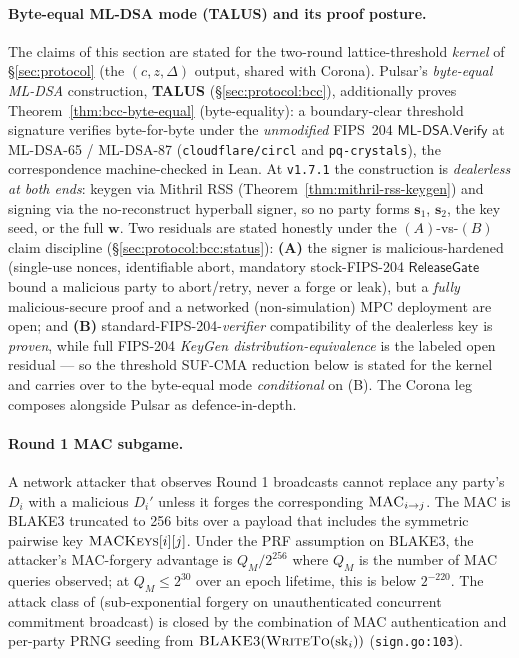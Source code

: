 \paragraph{Byte-equal ML-DSA mode (TALUS) and its proof posture.} The
claims of this section are stated for the two-round lattice-threshold
\emph{kernel} of \S\ref{sec:protocol} (the $(c, z, \Delta)$ output, shared
with Corona). Pulsar's \emph{byte-equal ML-DSA} construction, \textbf{TALUS}
(\S\ref{sec:protocol:bcc}), additionally proves
Theorem~\ref{thm:bcc-byte-equal} (byte-equality): a boundary-clear
threshold signature verifies byte-for-byte under the \emph{unmodified}
FIPS~204 $\mathsf{ML\text{-}DSA.Verify}$ at ML-DSA-65 / ML-DSA-87
(\texttt{cloudflare/circl} and \texttt{pq-crystals}), the correspondence
machine-checked in Lean. At \texttt{v1.7.1} the construction is
\emph{dealerless at both ends}: keygen via Mithril RSS
(Theorem~\ref{thm:mithril-rss-keygen}) and signing via the no-reconstruct
hyperball signer, so no party forms $\mathbf{s}_1$, $\mathbf{s}_2$, the key
seed, or the full $\mathbf{w}$. Two residuals are stated honestly under the
$(A)$-vs-$(B)$ claim discipline (\S\ref{sec:protocol:bcc:status}):
\textbf{(A)} the signer is malicious-hardened (single-use nonces,
identifiable abort, mandatory stock-FIPS-204 $\mathsf{ReleaseGate}$ bound a
malicious party to abort/retry, never a forge or leak), but a \emph{fully}
malicious-secure proof and a networked (non-simulation) MPC deployment are
open; and \textbf{(B)} standard-FIPS-204-\emph{verifier} compatibility of
the dealerless key is \emph{proven}, while full FIPS-204 \emph{KeyGen
distribution-equivalence} is the labeled open residual --- so the threshold
SUF-CMA reduction below is stated for the kernel and carries over to the
byte-equal mode \emph{conditional} on (B). The Corona leg composes
alongside Pulsar as defence-in-depth.

\paragraph{Round 1 MAC subgame.} A network attacker that observes
Round 1 broadcasts cannot replace any party's $D_i$ with a malicious
$D_i'$ unless it forges the corresponding $\textsc{MAC}_{i \to j}$. The
MAC is BLAKE3 \cite{blake3} truncated to 256 bits over a payload that
includes the symmetric pairwise key $\textsc{MACKeys}[i][j]$. Under the
PRF assumption on BLAKE3, the attacker's MAC-forgery advantage is
$Q_M / 2^{256}$ where $Q_M$ is the number of MAC queries observed; at
$Q_M \leq 2^{30}$ over an epoch lifetime, this is below $2^{-220}$.
The attack class of \cite{drijvers2019} (sub-exponential forgery on
unauthenticated concurrent commitment broadcast) is closed by the
combination of MAC authentication and per-party PRNG seeding from
$\textsc{BLAKE3}(\textsc{WriteTo}(\mathrm{sk}_i))$
(\texttt{sign.go:103}).


